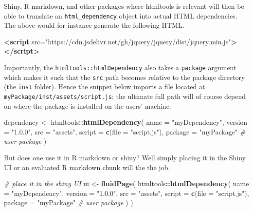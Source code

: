 \documentclass[
]{krantz}
\makeatletter
\newenvironment{Shaded}{\begin{snugshade}}{\end{snugshade}}
\newcommand{\CommentTok}[1]{\textcolor[rgb]{0.37,0.37,0.37}{\textit{#1}}}
\newcommand{\DataTypeTok}[1]{\textcolor[rgb]{0.27,0.27,0.27}{#1}}
\newcommand{\KeywordTok}[1]{\textcolor[rgb]{0.27,0.27,0.27}{\textbf{#1}}}
\newcommand{\NormalTok}[1]{#1}
\newcommand{\OperatorTok}[1]{\textcolor[rgb]{0.43,0.43,0.43}{\textbf{#1}}}
\newcommand{\OtherTok}[1]{\textcolor[rgb]{0.37,0.37,0.37}{#1}}
\newcommand{\StringTok}[1]{\textcolor[rgb]{0.5,0.5,0.5}{#1}}
\newenvironment{kframe}{%
\medskip{}
\setlength{\fboxsep}{.8em}
 \def\at@end@of@kframe{}%
 \ifinner\ifhmode%
  \def\at@end@of@kframe{\end{minipage}}%
  \begin{minipage}{\columnwidth}%
 \fi\fi%
 \def\FrameCommand##1{\hskip\@totalleftmargin \hskip-\fboxsep
 \colorbox{shadecolor}{##1}\hskip-\fboxsep
     \hskip-\linewidth \hskip-\@totalleftmargin \hskip\columnwidth}%
 \MakeFramed {\advance\hsize-\width
   \@totalleftmargin\z@ \linewidth\hsize
   \@setminipage}}%
 {\par\unskip\endMakeFramed%
 \at@end@of@kframe}
\renewenvironment{Shaded}{\begin{kframe}}{\end{kframe}}
\makeatother
\begin{document}
Shiny, R markdown, and other packages where htmltools is relevant will then be able to translate an \texttt{html\_dependency} object into actual HTML dependencies. The above would for instance generate the following HTML.

\begin{Shaded}
\begin{Highlighting}[]
\KeywordTok{<script}\OtherTok{ src=}\StringTok{"https://cdn.jsdelivr.net/gh/jquery/jquery/dist/jquery.min.js"}\KeywordTok{></script>}
\end{Highlighting}
\end{Shaded}

Importantly, the \texttt{htmltools::htmlDependency} also takes a \texttt{package} argument which makes it such that the \texttt{src} path becomes relative to the package directory (the \texttt{inst} folder). Hence the snippet below imports a file located at \texttt{myPackage/inst/assets/script.js}; the ultimate full path will of course depend on where the package is installed on the users' machine.

\begin{Shaded}
\begin{Highlighting}[]
\NormalTok{dependency <{-}}\StringTok{ }\NormalTok{htmltools}\OperatorTok{::}\KeywordTok{htmlDependency}\NormalTok{(}
  \DataTypeTok{name =} \StringTok{"myDependency"}\NormalTok{,}
  \DataTypeTok{version =} \StringTok{"1.0.0"}\NormalTok{,}
  \DataTypeTok{src =} \StringTok{"assets"}\NormalTok{,}
  \DataTypeTok{script =} \KeywordTok{c}\NormalTok{(}\DataTypeTok{file =} \StringTok{"script.js"}\NormalTok{),}
  \DataTypeTok{package =} \StringTok{"myPackage"} \CommentTok{\# user package}
\NormalTok{)}
\end{Highlighting}
\end{Shaded}

But does one use it in R markdown or shiny? Well simply placing it in the Shiny UI or an evaluated R markdown chunk will the the job.

\begin{Shaded}
\begin{Highlighting}[]
\CommentTok{\# place it in the shiny UI}
\NormalTok{ui <{-}}\StringTok{ }\KeywordTok{fluidPage}\NormalTok{(}
\NormalTok{  htmltools}\OperatorTok{::}\KeywordTok{htmlDependency}\NormalTok{(}
    \DataTypeTok{name =} \StringTok{"myDependency"}\NormalTok{,}
    \DataTypeTok{version =} \StringTok{"1.0.0"}\NormalTok{,}
    \DataTypeTok{src =} \StringTok{"assets"}\NormalTok{,}
    \DataTypeTok{script =} \KeywordTok{c}\NormalTok{(}\DataTypeTok{file =} \StringTok{"script.js"}\NormalTok{),}
    \DataTypeTok{package =} \StringTok{"myPackage"} \CommentTok{\# user package}
\NormalTok{  )}
\NormalTok{)}
\end{Highlighting}
\end{Shaded}
\end{document}
